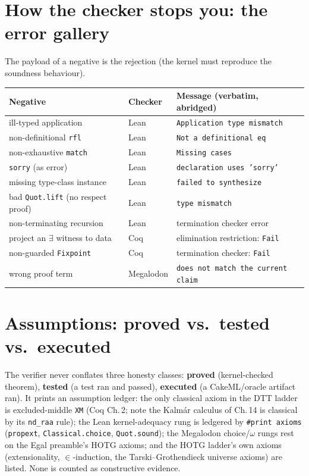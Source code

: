 \documentclass[11pt]{article}
\begin{document}
\section{How the checker stops you: the error gallery}
The payload of a negative is the rejection (the kernel must reproduce the soundness behaviour).
\begin{center}\small
\begin{tabular}{@{}lll@{}}
\toprule
Negative & Checker & Message (verbatim, abridged) \\
\midrule
ill-typed application       & Lean & \texttt{Application type mismatch} \\
non-definitional \texttt{rfl}  & Lean & \texttt{Not a definitional eq} \\
non-exhaustive \texttt{match}  & Lean & \texttt{Missing cases} \\
\texttt{sorry} (as error)   & Lean & \texttt{declaration uses 'sorry'} \\
missing type-class instance & Lean & \texttt{failed to synthesize} \\
bad \texttt{Quot.lift} (no respect proof) & Lean & \texttt{type mismatch} \\
non-terminating recursion   & Lean & termination checker error \\
project an $\exists$ witness to data & Coq & elimination restriction: \texttt{Fail} \\
non-guarded \texttt{Fixpoint} & Coq & termination checker: \texttt{Fail} \\
wrong proof term            & Megalodon & \texttt{does not match the current claim} \\
\bottomrule
\end{tabular}
\end{center}

\section{Assumptions: proved vs.\ tested vs.\ executed}\label{sec:ledger}
The verifier never conflates three honesty classes: \textbf{proved} (kernel-checked theorem),
\textbf{tested} (a test ran and passed), \textbf{executed} (a CakeML/oracle artifact ran). It prints
an assumption ledger: the only classical axiom in the DTT ladder is excluded-middle \texttt{XM} (Coq
Ch.\,2; note the Kalmár calculus of Ch.\,14 is classical by its \texttt{nd\_raa} rule); the Lean
kernel-adequacy rung is ledgered by \texttt{\#print axioms} (\texttt{propext},
\texttt{Classical.choice}, \texttt{Quot.sound}); the Megalodon choice/$\omega$ rungs rest on the Egal
preamble's HOTG axioms; and the HOTG ladder's own axioms (extensionality, $\in$-induction, the
Tarski--Grothendieck universe axioms) are listed. None is counted as constructive evidence.
\end{document}
